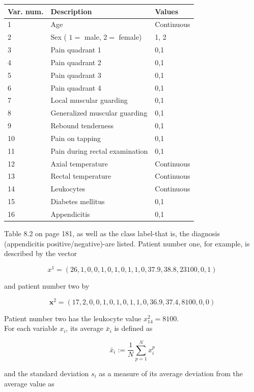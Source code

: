 \documentclass[10pt]{article}
\begin{document}
\begin{center}
\begin{tabular}{|l|l|l|}
\hline
Var. num. & Description & Values \\
\hline
1 & Age & Continuous \\
\hline
2 & Sex ( $1=$ male, $2=$ female) & 1, 2 \\
\hline
3 & Pain quadrant 1 & 0,1 \\
\hline
4 & Pain quadrant 2 & 0,1 \\
\hline
5 & Pain quadrant 3 & 0,1 \\
\hline
6 & Pain quadrant 4 & 0,1 \\
\hline
7 & Local muscular guarding & 0,1 \\
\hline
8 & Generalized muscular guarding & 0,1 \\
\hline
9 & Rebound tenderness & 0,1 \\
\hline
10 & Pain on tapping & 0,1 \\
\hline
11 & Pain during rectal examination & 0,1 \\
\hline
12 & Axial temperature & Continuous \\
\hline
13 & Rectal temperature & Continuous \\
\hline
14 & Leukocytes & Continuous \\
\hline
15 & Diabetes mellitus & 0,1 \\
\hline
16 & Appendicitis & 0,1 \\

\hline
\end{tabular}
\end{center}

Table 8.2 on page 181, as well as the class label-that is, the diagnosis (appendicitis positive/negative)-are listed. Patient number one, for example, is described by the vector

$$
x^{1}=(26,1,0,0,1,0,1,0,1,1,0,37.9,38.8,23100,0,1)
$$

and patient number two by

$$
\boldsymbol{x}^{2}=(17,2,0,0,1,0,1,0,1,1,0,36.9,37.4,8100,0,0)
$$

Patient number two has the leukocyte value $x_{14}^{2}=8100$.\\
For each variable $x_{i}$, its average $\bar{x}_{i}$ is defined as

$$
\bar{x}_{i}:=\frac{1}{N} \sum_{p=1}^{N} x_{i}^{p}
$$

and the standard deviation $s_{i}$ as a measure of its average deviation from the average value as
\end{document}
